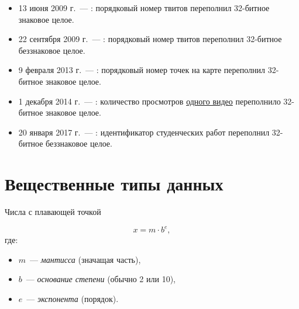 \begin{frame}{}

  \begin{itemize}
    \pause
    \item 13 июня 2009 г.~--- : порядковый номер твитов
      переполнил 32-битное знаковое целое.
    \pause
    \item 22 сентября 2009 г.~--- : порядковый номер твитов
      переполнил 32-битное беззнаковое целое.
    \pause
    \item 9 февраля 2013 г.~--- : порядковый номер точек на
      карте переполнил 32-битное знаковое целое.
    \pause
    \item 1 декабря 2014 г.~--- : количество просмотров
      \href{https://www.youtube.com/watch?v=9bZkp7q19f0}{одного видео}
      переполнило 32-битное знаковое целое.
    \pause
    \item 20 января 2017 г.~--- : идентификатор студенческих
      работ переполнил 32-битное беззнаковое целое.
  \end{itemize}


\end{frame}


\section{Вещественные типы данных}

\begin{frame}{Числа с плавающей точкой}


  {\Large \[ x = m \cdot b^e, \] }
  где:
  \begin{itemize}
    \item $m$~--- \emph{мантисса} (значащая часть),
    \item $b$~--- \emph{основание степени} (обычно 2 или 10),
    \item $e$~--- \emph{экспонента} (порядок).
  \end{itemize}

\end{frame}

